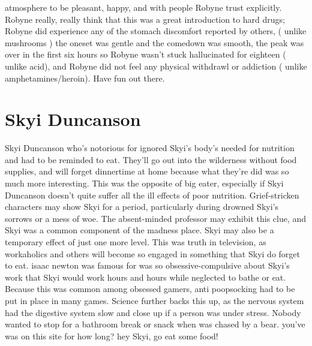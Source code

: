 \documentclass[12pt]{book}
\begin{document}
atmosphere to be pleasant, happy, and with people Robyne trust explicitly. Robyne really, really think that this was a great introduction to hard drugs; Robyne did experience any of the stomach discomfort reported by others, ( unlike mushrooms ) the oneset was gentle and the comedown was smooth, the peak was over in the first six hours so Robyne wasn't stuck hallucinated for eighteen ( unlike acid), and Robyne did not feel any physical withdrawl or addiction ( unlike amphetamines/heroin). Have fun out there.



\chapter{Skyi Duncanson}

Skyi Duncanson who's notorious for ignored Skyi's body's needed for nutrition and had to be reminded to eat. They'll go out into the wilderness without food supplies, and will forget dinnertime at home because what they're did was so much more interesting. This was the opposite of big eater, especially if Skyi Duncanson doesn't quite suffer all the ill effects of poor nutrition. Grief-stricken characters may show Skyi for a period, particularly during drowned Skyi's sorrows or a mess of woe. The absent-minded professor may exhibit this clue, and Skyi was a common component of the madness place. Skyi may also be a temporary effect of just one more level. This was truth in television, as workaholics and others will become so engaged in something that Skyi do forget to eat. isaac newton was famous for was so obsessive-compulsive about Skyi's work that Skyi would work hours and hours while neglected to bathe or eat. Because this was common among obsessed gamers, anti poopsocking had to be put in place in many games. Science further backs this up, as the nervous system had the digestive system slow and close up if a person was under stress. Nobody wanted to stop for a bathroom break or snack when was chased by a bear. you've was on this site for how long? hey Skyi, go eat some food!
\end{document}
